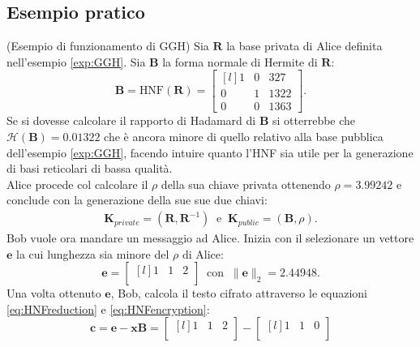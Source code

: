 \subsection{Esempio pratico}
\label{exp:HNF}

\begin{exmp} (Esempio di funzionamento di GGH)
    Sia $\mathbf{R}$ la base privata di Alice definita nell'esempio \ref{exp:GGH}. Sia $\mathbf{B}$ 
    la forma normale di Hermite di $\mathbf{R}$:
    \[
        \mathbf{B}=\text{HNF}(\mathbf{R})=
        \begin{bmatrix*}[l]
            1 & 0 & 327\\
            0 & 1 & 1322\\
            0 & 0 & 1363
        \end{bmatrix*}.
    \] 
    Se si dovesse calcolare il rapporto di Hadamard di $\mathbf{B}$ si otterrebbe che 
    $\mathcal{H}(\mathbf{B}) = 0.01322$ che è ancora minore di quello relativo alla base pubblica dell'esempio
    \ref{exp:GGH}, facendo intuire quanto l'HNF sia utile per la generazione di basi reticolari
    di bassa qualità. \\
    Alice procede col calcolare il $\rho$ della sua chiave privata ottenendo $\rho = 3.99242$ e
    conclude con la generazione della sue sue due chiavi:
    \begin{gather*}
        \mathbf{K}_{private} = (\mathbf{R}, \mathbf{R}^{-1}) 
        \ \text{ e } \  
        \mathbf{K}_{public} = (\mathbf{B}, \rho).
    \end{gather*}
    Bob vuole ora mandare un messaggio ad Alice. Inizia con il selezionare un vettore $\mathbf{e}$
    la cui lunghezza sia minore del $\rho$ di Alice:
    \[
        \mathbf{e} = 
        \begin{bmatrix*}[l]
            1 & 1 & 2\\
        \end{bmatrix*}
        \ \text{ con } \ \|\mathbf{e}\|_2 = 2.44948.
    \]
    Una volta ottenuto $\mathbf{e}$, Bob, calcola il testo cifrato attraverso
    le equazioni \ref{eq:HNFreduction} e \ref{eq:HNFencryption}:
    \[
        \mathbf{c} = \mathbf{e} - \mathbf{x}\mathbf{B} = 
        \begin{bmatrix*}[l]
            1 & 1 & 2\\
        \end{bmatrix*}
        -
        \begin{bmatrix*}[l]
            1 & 1 & 0\\
        \end{bmatrix*}
\]
\end{exmp}
